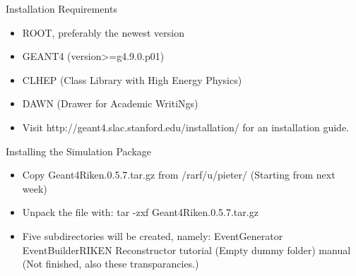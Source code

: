 \documentclass[
  style=pd,
  clock
]{powerdot}
\begin{document}
\begin{CJK}{UTF8}{min}
\begin{slide}[toc=]{Installation Requirements}
  \begin{itemize} pt
  \item ROOT, preferably the newest version
  \item GEANT4 (version>=g4.9.0.p01)
  \item CLHEP (Class Library with High Energy Physics)
  \item DAWN (Drawer for Academic WritiNgs)
  \item  Visit \newline \newline  
    {\ttfamily http://geant4.slac.stanford.edu/installation/} \newline \newline 
    for an installation guide.
  \end{itemize}
\end{slide}

\begin{slide}{Installing the Simulation Package}
\begin{itemize}\itemsep13pt
\item Copy {\ttfamily Geant4Riken.0.5.7.tar.gz} from \newline
  {\ttfamily /rarf/u/pieter/} \newline
  (Starting from next week)
\item Unpack the file with: \newline
  {\ttfamily tar -zxf Geant4Riken.0.5.7.tar.gz}\pause
\item Five subdirectories will be created, namely:\newline
  {\ttfamily EventGenerator\newline
    EventBuilderRIKEN\newline
    Reconstructor\newline
    tutorial} (Empty dummy folder) \newline
  {\ttfamily manual} (Not finished, also these transparancies.)
\end{itemize}
\end{slide}


\end{CJK}
\end{document}
